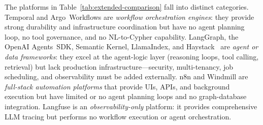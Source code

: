 \documentclass[a4paper,noexaminfo]{sapthesis}
\begin{document}
\begin{table}[ht]
\centering
\caption{Capability comparison of the CINECA Agentic Platform (CAP) against
ten representative platforms across eight enterprise-readiness dimensions.
Y~=~built-in, P~=~partial or integration-dependent, N~=~not in scope.}
\label{tab:extended-comparison}
\small
\setlength{\tabcolsep}{3pt}
\renewcommand{\arraystretch}{1.15}
\end{table}

The platforms in Table~\ref{tab:extended-comparison} fall into distinct
categories.  Temporal and Argo~Workflows are \emph{workflow orchestration
engines}: they provide strong durability and infrastructure
coordination but have no agent planning loop, no tool governance, and no
NL-to-Cypher capability.  LangGraph, the OpenAI Agents~SDK, Semantic
Kernel, LlamaIndex, and Haystack~\cite{haystack2023} are \emph{agent or data frameworks}: they
excel at the agent-logic layer (reasoning loops, tool calling, retrieval)
but lack production infrastructure---security, multi-tenancy, job
scheduling, and observability must be added externally.  n8n and Windmill
are \emph{full-stack automation platforms} that provide UIs, APIs, and
background execution but have limited or no agent planning loops and no
graph-database integration.  Langfuse is an \emph{observability-only}
platform: it provides comprehensive LLM tracing but performs no workflow
execution or agent orchestration.
\end{document}
